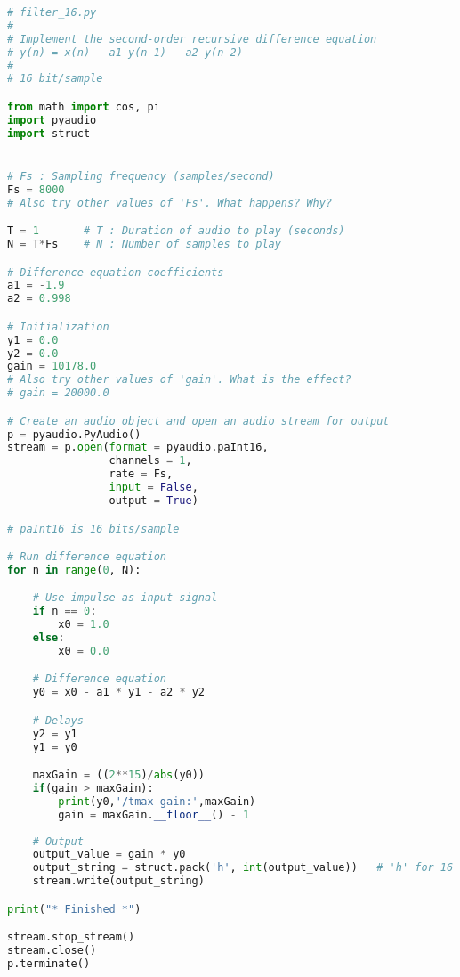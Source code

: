 \documentclass[11pt]{article}
\begin{document}
\begin{lstlisting}[language=python, label={lst:code}, breaklines=true, caption={Snippet of the if function to enable clipping}]
    # filter_16.py
# 
# Implement the second-order recursive difference equation
# y(n) = x(n) - a1 y(n-1) - a2 y(n-2)
# 
# 16 bit/sample

from math import cos, pi 
import pyaudio
import struct


# Fs : Sampling frequency (samples/second)
Fs = 8000
# Also try other values of 'Fs'. What happens? Why?

T = 1       # T : Duration of audio to play (seconds)
N = T*Fs    # N : Number of samples to play

# Difference equation coefficients
a1 = -1.9
a2 = 0.998

# Initialization
y1 = 0.0
y2 = 0.0
gain = 10178.0
# Also try other values of 'gain'. What is the effect?
# gain = 20000.0

# Create an audio object and open an audio stream for output
p = pyaudio.PyAudio()
stream = p.open(format = pyaudio.paInt16,  
                channels = 1, 
                rate = Fs,
                input = False, 
                output = True)

# paInt16 is 16 bits/sample

# Run difference equation
for n in range(0, N):

    # Use impulse as input signal
    if n == 0:
        x0 = 1.0
    else:
        x0 = 0.0

    # Difference equation
    y0 = x0 - a1 * y1 - a2 * y2

    # Delays
    y2 = y1
    y1 = y0

    maxGain = ((2**15)/abs(y0))
    if(gain > maxGain):
        print(y0,'/tmax gain:',maxGain)
        gain = maxGain.__floor__() - 1
        
    # Output
    output_value = gain * y0
    output_string = struct.pack('h', int(output_value))   # 'h' for 16 bits
    stream.write(output_string)

print("* Finished *")

stream.stop_stream()
stream.close()
p.terminate()

\end{lstlisting}

    
    
\end{document}
